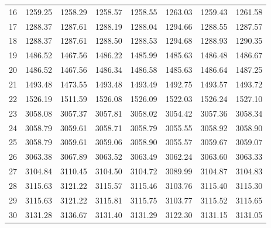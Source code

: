 \documentclass[10pt,oneside]{article}
\begin{document}
\begin{table}[h!]
\begin{tabular}{cccccccc}
16 &   1259.25 & 1258.29 & 1258.57 & 1258.55 &      1263.03 & 1259.43 & 1261.58 \\
17 &   1288.37 & 1287.61 & 1288.19 & 1288.04 &      1294.66 & 1288.55 & 1287.57 \\
18 &   1288.37 & 1287.61 & 1288.50 & 1288.53 &      1294.68 & 1288.93 & 1290.35 \\
19 &   1486.52 & 1467.56 & 1486.22 & 1485.99 &      1485.63 & 1486.48 & 1486.67 \\
20 &   1486.52 & 1467.56 & 1486.34 & 1486.58 &      1485.63 & 1486.64 & 1487.25 \\
21 &   1493.48 & 1473.55 & 1493.48 & 1493.49 &      1492.75 & 1493.57 & 1493.72 \\
22 &   1526.19 & 1511.59 & 1526.08 & 1526.09 &      1522.03 & 1526.24 & 1527.10 \\
23 &   3058.08 & 3057.37 & 3057.81 & 3058.02 &      3054.42 & 3057.36 & 3058.34 \\
24 &   3058.79 & 3059.61 & 3058.71 & 3058.79 &      3055.55 & 3058.92 & 3058.90 \\
25 &   3058.79 & 3059.61 & 3059.06 & 3058.90 &      3055.57 & 3059.67 & 3059.07 \\
26 &   3063.38 & 3067.89 & 3063.52 & 3063.49 &      3062.24 & 3063.60 & 3063.33 \\
27 &   3104.84 & 3110.45 & 3104.50 & 3104.72 &      3089.99 & 3104.87 & 3104.83 \\
28 &   3115.63 & 3121.22 & 3115.57 & 3115.46 &      3103.76 & 3115.40 & 3115.30 \\
29 &   3115.63 & 3121.22 & 3115.81 & 3115.75 &      3103.77 & 3115.52 & 3115.65 \\
30 &   3131.28 & 3136.67 & 3131.40 & 3131.29 &      3122.30 & 3131.15 & 3131.05 \\
\bottomrule
\end{tabular}
\end{table}

\clearpage
\end{document}
